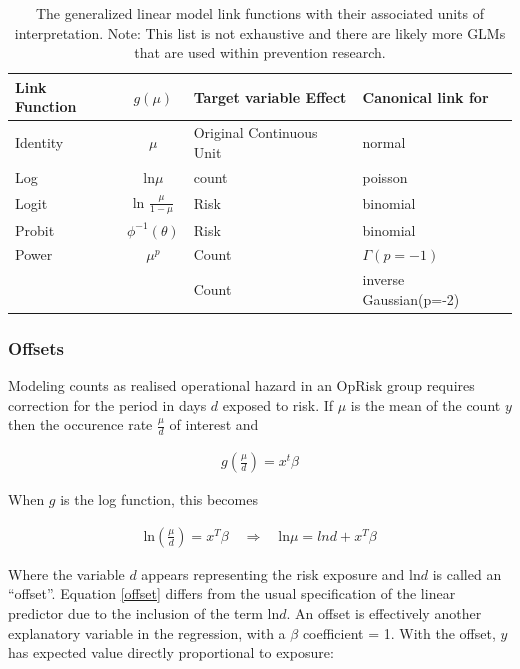 \documentclass[]{article}
\begin{document}
\begin{table}[tb]
\centering
\caption{The generalized linear model link functions with their associated units of interpretation. Note: This list is not exhaustive and there are likely more GLMs that are used within prevention research.} 
\label{tab_linkfcn}
\begin{tabular}{lcll}
\toprule
Link Function & $g(\mu)$ & Target variable Effect & Canonical link for \\ 
\midrule
Identity & $\mu$ & Original Continuous Unit & normal \\ 
  Log & ln$\mu$ & count & poisson \\ 
  Logit & ln $\frac{\mu}{1-\mu}$ & Risk & binomial \\ 
  Probit & $\phi^{-1}(\theta)$ & Risk & binomial \\ 
  Power & $\mu^p$ & Count & $\Gamma(p=-1)$\\
        &       & Count & inverse Gaussian(p=-2)\\
\bottomrule
\end{tabular}
\end{table}

\subsubsection{Offsets}

Modeling counts as realised operational hazard in an OpRisk group
requires correction for the period in days \(d\) exposed to risk. If
\(\mu\) is the mean of the count \(y\) then the occurence rate
\(\frac{\mu}{d}\) of interest and

\singlespacing

\begin{eqnarray}
g\left(\frac{\mu}{d}\right) = x^t\beta
\end{eqnarray} \doublespacing

When \(g\) is the log function, this becomes

\singlespacing

\begin{eqnarray}\label{offset}
\mbox{ln}\left(\frac{\mu}{d}\right) = x^T\beta \quad \Rightarrow \quad \mbox{ln}\mu = ln d + x^T\beta
\end{eqnarray} \doublespacing

Where the variable \(d\) appears representing the risk exposure and
ln\(d\) is called an ``offset''. Equation \ref{offset} differs from the
usual specification of the linear predictor due to the inclusion of the
term ln\(d\). An offset is effectively another explanatory variable in
the regression, with a \(\beta\) coefficient = 1. With the offset, \(y\)
has expected value directly proportional to exposure:
\end{document}
